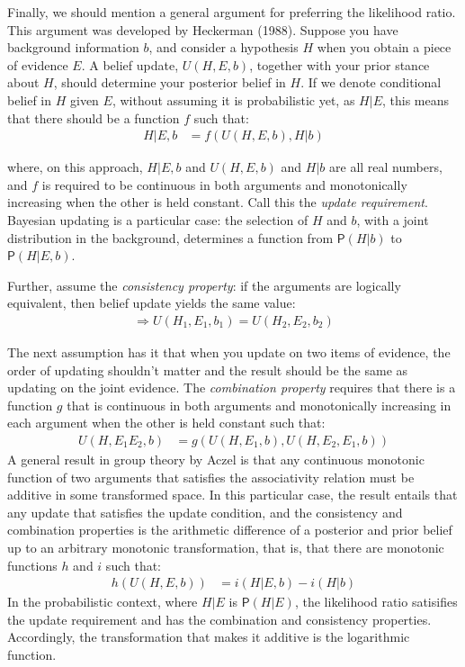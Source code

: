 \documentclass[
  10pt,
  dvipsnames,enabledeprecatedfontcommands]{scrartcl}
\newcommand{\pr}[1]{\mathsf{P}(#1)}
\begin{document}
Finally, we should mention a general argument for preferring the
likelihood ratio. This argument was developed by Heckerman (1988).
Suppose you have background information \(b\), and consider a hypothesis
\(H\) when you obtain a piece of evidence \(E\). A belief update,
\(U(H, E, b)\), together with your prior stance about \(H\), should
determine your posterior belief in \(H\). If we denote conditional
belief in \(H\) given \(E\), without assuming it is probabilistic yet,
as \(H\vert E\), this means that there should be a function \(f\) such
that: \begin{align*}
H \vert E, b & = f(U(H,E,b), H \vert b)
\end{align*}

\noindent where, on this approach, \(H \vert E, b\) and \(U(H,E,b)\) and
\(H \vert b\) are all real numbers, and \(f\) is required to be
continuous in both arguments and monotonically increasing when the other
is held constant. Call this the \textit{update requirement}. Bayesian
updating is a particular case: the selection of \(H\) and \(b\), with a
joint distribution in the background, determines a function from
\(\pr{H \vert b}\) to \(\pr{H \vert E, b}\).

Further, assume the \textit{consistency property}: if the arguments are
logically equivalent, then belief update yields the same value:
\begin{align*}
[H_1 \Leftrightarrow H_2, E_1 \Leftrightarrow E_2] \Rightarrow U(H_1, E_1, b_1) = U(H_2, E_2, b_2)
\end{align*}

\noindent The next assumption has it that when you update on two items
of evidence, the order of updating shouldn't matter and the result
should be the same as updating on the joint evidence. The
\textit{combination property} requires that there is a function \(g\)
that is continuous in both arguments and monotonically increasing in
each argument when the other is held constant such that: \begin{align*}
U(H, E_1E_2,b) & =  g(U(H,E_1, b), U(H, E_2, E_1, b))
\end{align*} A general result in group theory by Aczel is that any
continuous monotonic function of two arguments that satisfies the
associativity relation must be additive in some transformed space. In
this particular case, the result entails that any update that satisfies
the update condition, and the consistency and combination properties is
the arithmetic difference of a posterior and prior belief up to an
arbitrary monotonic transformation, that is, that there are monotonic
functions \(h\) and \(i\) such that: \begin{align*}
h(U(H,E,b)) & = i(H\vert E, b) - i(H\vert b)
\end{align*} In the probabilistic context, where \(H\vert E\) is
\(\pr{H\vert E}\), the likelihood ratio satisifies the update
requirement and has the combination and consistency properties.
Accordingly, the transformation that makes it additive is the
logarithmic function.
\end{document}
